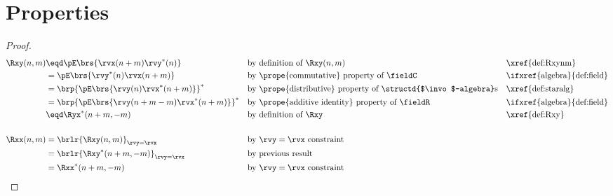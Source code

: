 \section{Properties}
\begin{theorem}
\label{thm:Rxxnm}
\label{thm:Ryynm}
\label{thm:Rxynm}
\end{theorem}
\begin{proof}
\begin{align*}
  \Rxy(n,m)
     &\eqd \pE\brs{\rvx(n+m) \rvy^\ast(n)}
     && \text{by definition of $\Rxy(n,m)$}
     && \text{\xref{def:Rxynm}}
   \\&= \pE\brs{\rvy^\ast(n) \rvx(n+m)}
     && \text{by \prope{commutative} property of $\fieldC$}
     && \text{\ifxref{algebra}{def:field}}
   \\&= \brp{\pE\brs{\rvy(n) \rvx^\ast(n+m)}}^\ast
     && \text{by \prope{distributive} property of \structd{$\invo$-algebra}s}
     && \text{\xref{def:staralg}}
   \\&= \brp{\pE\brs{\rvy(n+m-m) \rvx^\ast(n+m)}}^\ast
     && \text{by \prope{additive identity} property of $\fieldR$}
     && \text{\ifxref{algebra}{def:field}}
   \\&\eqd \Ryx^\ast(n+m,-m)
     && \text{by definition of $\Rxy$}
     && \text{\xref{def:Rxy}}
   \\
   \\
   \Rxx(n,m)
     &= \brlr{\Rxy(n,m)}_{\rvy=\rvx}
     && \text{by $\rvy=\rvx$ constraint}
   \\&= \brlr{\Rxy^\ast(n+m,-m)}_{\rvy=\rvx}
     && \text{by previous result}
   \\&= \Rxx^\ast(n+m,-m)
     && \text{by $\rvy=\rvx$ constraint}
\end{align*}
\end{proof}

